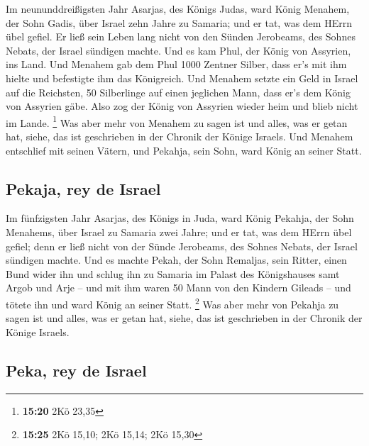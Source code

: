  Im neununddreißigsten Jahr Asarjas, des Königs Judas,
ward König Menahem, der Sohn Gadis, über Israel zehn Jahre zu Samaria;
 und er tat, was dem HErrn übel gefiel. Er ließ sein
Leben lang nicht von den Sünden Jerobeams, des Sohnes Nebats, der Israel
sündigen machte.  Und es kam Phul, der König von
Assyrien, ins Land. Und Menahem gab dem Phul 1000 Zentner Silber, dass
er's mit ihm hielte und befestigte ihm das Königreich. 
Und Menahem setzte ein Geld in Israel auf die Reichsten, 50 Silberlinge
auf einen jeglichen Mann, dass er's dem König von Assyrien gäbe. Also
zog der König von Assyrien wieder heim und blieb nicht im Lande.
\footnote{\textbf{15:20} 2Kö 23,35}  Was aber mehr von
Menahem zu sagen ist und alles, was er getan hat, siehe, das ist
geschrieben in der Chronik der Könige Israels.  Und
Menahem entschlief mit seinen Vätern, und Pekahja, sein Sohn, ward König
an seiner Statt.

\hypertarget{pekaja-rey-de-israel}{%
\subsection{Pekaja, rey de Israel}\label{pekaja-rey-de-israel}}

 Im fünfzigsten Jahr Asarjas, des Königs in Juda, ward
König Pekahja, der Sohn Menahems, über Israel zu Samaria zwei Jahre;
 und er tat, was dem HErrn übel gefiel; denn er ließ
nicht von der Sünde Jerobeams, des Sohnes Nebats, der Israel sündigen
machte.  Und es machte Pekah, der Sohn Remaljas, sein
Ritter, einen Bund wider ihn und schlug ihn zu Samaria im Palast des
Königshauses samt Argob und Arje -- und mit ihm waren 50 Mann von den
Kindern Gileads -- und tötete ihn und ward König an seiner Statt.
\footnote{\textbf{15:25} 2Kö 15,10; 2Kö 15,14; 2Kö 15,30}
 Was aber mehr von Pekahja zu sagen ist und alles, was er
getan hat, siehe, das ist geschrieben in der Chronik der Könige Israels.

\hypertarget{peka-rey-de-israel}{%
\subsection{Peka, rey de Israel}\label{peka-rey-de-israel}}

